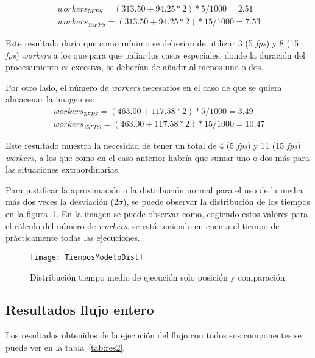 {\begin{equation}
\begin{split}
workers_{5FPS} = (313.50 + 94.25*2)*5/1000 = 2.51\\
workers_{15FPS} = (313.50 + 94.25*2)*15/1000 = 7.53
\end{split}
\end{equation}

Este resultado daría que como mínimo se deberían de utilizar 3 (5 \textit{fps}) y 8 (15 \textit{fps}) \textit{workers} a los que para que paliar los casos especiales, donde la duración del procesamiento es excesiva, se deberían de añadir al menos uno o dos.

Por otro lado, el número de \textit{workers} necesarios en el caso de que se quiera almacenar la imagen es:
\begin{equation}
\begin{split}
workers_{5FPS} = (463.00 + 117.58*2)*5/1000 = 3.49\\
workers_{15FPS} = (463.00 + 117.58*2)*15/1000 = 10.47
\end{split}
\end{equation}

Este resultado muestra la necesidad de tener un total de 4 (5 \textit{fps}) y 11 (15 \textit{fps}) \textit{workers}, a los que como en el caso anterior habría que sumar uno o dos más para las situaciones extraordinarias.

Para justificar la aproximación a la distribución normal para el uso de la media más dos veces la desviación ($2\sigma$), se puede observar la distribución de los tiempos en la figura~\ref{fig:dist1}. En la imagen se puede observar como, cogiendo estos valores para el cálculo del número de \textit{workers}, se está teniendo en cuenta el tiempo de prácticamente todas las ejecuciones.

\begin{figure}[h]
	\centering
	\texttt{[image: TiemposModeloDist]}
	\caption{Distribución tiempo medio de ejecución solo posición y comparación.}
	\label{fig:dist1}
\end{figure}

\subsection{Resultados flujo entero}
Los resultados obtenidos de la ejecución del flujo con todos sus componentes se puede ver en la tabla~\ref{tab:res2}.

}
